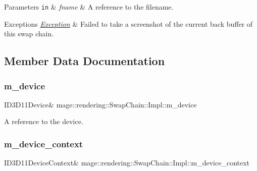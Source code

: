 \begin{DoxyParams}[1]{Parameters}
\mbox{\tt in}  & {\em fname} & A reference to the filename. \\
\hline
\end{DoxyParams}

\begin{DoxyExceptions}{Exceptions}
{\em \hyperlink{classmage_1_1_exception}{Exception}} & Failed to take a screenshot of the current back buffer of this swap chain. \\
\hline
\end{DoxyExceptions}


\subsection{Member Data Documentation}
\hypertarget{classmage_1_1rendering_1_1_swap_chain_1_1_impl_a6eff2673925babbd6dd9226dd07bf941}{}\label{classmage_1_1rendering_1_1_swap_chain_1_1_impl_a6eff2673925babbd6dd9226dd07bf941} 
\subsubsection{\texorpdfstring{m\+\_\+device}{m\_device}}
{\footnotesize\ttfamily I\+D3\+D11\+Device\& mage\+::rendering\+::\+Swap\+Chain\+::\+Impl\+::m\+\_\+device\hspace{0.3cm}{\ttfamily [private]}}

A reference to the device. \hypertarget{classmage_1_1rendering_1_1_swap_chain_1_1_impl_aead0bec9edcee29c39a264dc9ea43780}{}\label{classmage_1_1rendering_1_1_swap_chain_1_1_impl_aead0bec9edcee29c39a264dc9ea43780} 
\subsubsection{\texorpdfstring{m\+\_\+device\+\_\+context}{m\_device\_context}}
{\footnotesize\ttfamily I\+D3\+D11\+Device\+Context\& mage\+::rendering\+::\+Swap\+Chain\+::\+Impl\+::m\+\_\+device\+\_\+context\hspace{0.3cm}{\ttfamily [private]}}

